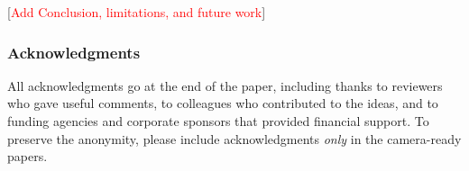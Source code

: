 \documentclass[twoside]{article}
\newcommand{\todo}[1]{[\textcolor{red}{#1}]}
\begin{document}
\todo{Add Conclusion, limitations, and future work}

\subsubsection*{Acknowledgments}
All acknowledgments go at the end of the paper, including thanks to reviewers who gave useful comments, to colleagues who contributed to the ideas, and to funding agencies and corporate sponsors that provided financial support. 
To preserve the anonymity, please include acknowledgments \emph{only} in the camera-ready papers.


\end{document}
